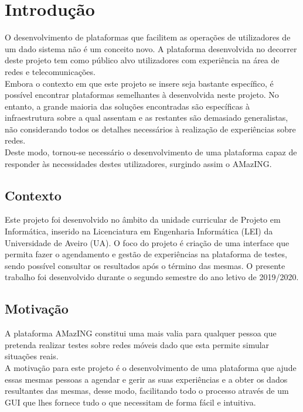 \chapter{Introdução}
\label{chp:introduction}
O desenvolvimento de plataformas que facilitem as operações de utilizadores de um dado sistema não é um conceito novo.  A plataforma desenvolvida no decorrer deste projeto tem como público alvo utilizadores com experiência na área de redes e telecomunicações.\newline\\
Embora o contexto em que este projeto se insere seja bastante específico, é possível encontrar plataformas semelhantes à desenvolvida neste projeto. No entanto, a grande maioria das soluções encontradas são específicas à infraestrutura sobre a qual assentam e as restantes são demasiado generalistas, não considerando todos os detalhes necessários à realização de experiências sobre redes.\newline\\
Deste modo, tornou-se necessário o desenvolvimento de uma plataforma capaz de responder às necessidades destes utilizadores, surgindo assim o AMazING.

\section{Contexto}
Este projeto foi desenvolvido no âmbito da unidade curricular de Projeto em Informática, inserido na Licenciatura em Engenharia Informática (LEI) da Universidade de Aveiro (UA). O foco do projeto é criação de uma interface que permita fazer o agendamento e gestão de experiências na plataforma de testes, sendo possível consultar os resultados após o término das mesmas. O presente trabalho foi desenvolvido durante o segundo semestre do ano letivo de 2019/2020.

\section{Motivação}
A plataforma AMazING constitui uma mais valia para qualquer pessoa que pretenda realizar testes sobre redes móveis dado que esta permite simular situações reais.\newline\\
A motivação para este projeto é o desenvolvimento de uma plataforma que ajude essas mesmas pessoas a agendar e gerir as suas experiências e a obter os dados resultantes das mesmas, desse modo, facilitando todo o processo através de um GUI que lhes fornece tudo o que necessitam de forma fácil e intuitiva.

